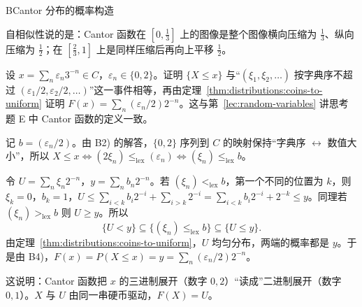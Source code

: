 \begin{probleme}{B}{Cantor 分布的概率构造}
\begin{questions}
\begin{solution}
自相似性说的是：Cantor 函数在 $[0,\frac13]$ 上的图像是整个图像横向压缩为 $\frac13$、纵向压缩为 $\frac12$；在 $[\frac23,1]$ 上是同样压缩后再向上平移 $\frac12$。
\end{solution}
\item 设 $x=\sum_n\varepsilon_n3^{-n}\in C$，$\varepsilon_n\in\{0,2\}$。证明 $\{X\leqslant x\}$ 与“$(\xi_1,\xi_2,\dots)$ 按字典序不超过 $(\varepsilon_1/2,\varepsilon_2/2,\dots)$”这一事件相等，再由定理~\ref{thm:distributions:coins-to-uniform} 证明 $F(x)=\sum_n(\varepsilon_n/2)2^{-n}$。这与第~\ref{lec:random-variables} 讲思考题 E 中 Cantor 函数的定义一致。
\begin{solution}
记 $b=(\varepsilon_n/2)$。由 B2) 的解答，$\{0,2\}$ 序列到 $C$ 的映射保持“字典序 $\leftrightarrow$ 数值大小”，所以 $X\leqslant x\iff(2\xi_n)\leqslant_{\mathrm{lex}}(\varepsilon_n)\iff(\xi_n)\leqslant_{\mathrm{lex}}b$。

令 $U=\sum_n\xi_n2^{-n}$，$y=\sum_nb_n2^{-n}$。若 $(\xi_n)<_{\mathrm{lex}}b$，第一个不同的位置为 $k$，则 $\xi_k=0$，$b_k=1$，$U\leqslant\sum_{i<k}b_i2^{-i}+\sum_{i>k}2^{-i}=\sum_{i<k}b_i2^{-i}+2^{-k}\leqslant y$。同理若 $(\xi_n)>_{\mathrm{lex}}b$ 则 $U\geqslant y$。所以
\[
\{U<y\}\subseteq\{(\xi_n)\leqslant_{\mathrm{lex}}b\}\subseteq\{U\leqslant y\}.
\]
由定理~\ref{thm:distributions:coins-to-uniform}，$U$ 均匀分布，两端的概率都是 $y$。于是由 B4)，$F(x)=P(X\leqslant x)=y=\sum_n(\varepsilon_n/2)2^{-n}$。

这说明：Cantor 函数把 $x$ 的三进制展开（数字 $0,2$）“读成”二进制展开（数字 $0,1$）。$X$ 与 $U$ 由同一串硬币驱动，$F(X)=U$。
\end{solution}
\end{questions}
\end{probleme}

